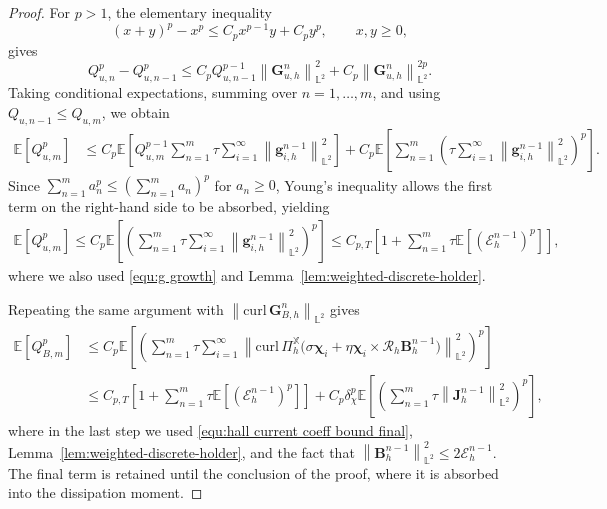 \documentclass[11pt, reqno]{amsart}
\theoremstyle{definition}
\numberwithin{equation}{section}
\newcommand{\curl}{\mathrm{curl}\,}
\newcommand{\bff}{\boldsymbol}
\newcommand{\bb}{\mathbb}
\newcommand{\norm}[2]{\left\|{#1}\right\|_{#2}}
\begin{document}
\begin{proof}
	For $p>1$, the elementary inequality
	\[
	(x+y)^p-x^p
	\le
	C_px^{p-1}y+C_py^p,
	\qquad x,y\ge0,
	\]
	gives
	\[
	Q_{u,n}^p-Q_{u,n-1}^p
	\le
	C_pQ_{u,n-1}^{p-1}
	\norm{\bff G_{u,h}^n}{\bb L^2}^2
	+
	C_p\norm{\bff G_{u,h}^n}{\bb L^2}^{2p}.
	\]
	Taking conditional expectations, summing over $n=1,\ldots,m$, and using
	$Q_{u,n-1}\le Q_{u,m}$, we obtain
	\begin{align*}
		\bb E[Q_{u,m}^p]
		&\le
		C_p\bb E\left[
		Q_{u,m}^{p-1}
		\sum_{n=1}^{m}\tau
		\sum_{i=1}^{\infty}
		\norm{\bff g_{i,h}^{n-1}}{\bb L^2}^2
		\right]
		+
		C_p\bb E\left[
		\sum_{n=1}^{m}
		\left(
		\tau\sum_{i=1}^{\infty}
		\norm{\bff g_{i,h}^{n-1}}{\bb L^2}^2
		\right)^p
		\right].
	\end{align*}
	Since $\sum_{n=1}^{m}a_n^p
	\le
	\left(\sum_{n=1}^{m}a_n\right)^p$ for $a_n\ge0$,
	Young's inequality allows the first term on the right-hand side to be absorbed, yielding
	\begin{align}
		\label{equ:Q u p bound revised}
		\bb E[Q_{u,m}^p]
		\le
		C_p\bb E\left[
		\left(
		\sum_{n=1}^{m}\tau
		\sum_{i=1}^{\infty}
		\norm{\bff g_{i,h}^{n-1}}{\bb L^2}^2
		\right)^p
		\right]
		\le
		C_{p,T}
		\left[
		1+
		\sum_{n=1}^{m}\tau
		\bb E\left[(\mathcal E_h^{n-1})^p\right]
		\right],
	\end{align}
	where we also used \eqref{equ:g growth} and
	Lemma~\ref{lem:weighted-discrete-holder}.

	
	Repeating the same argument with
	$\norm{\curl\bff G_{B,h}^n}{\bb L^2}$ gives
	\begin{align}\label{equ:Q B p bound revised}
		\bb E[Q_{B,m}^p]
		&\le
		C_p\bb E\left[
		\left(
		\sum_{n=1}^{m}\tau
		\sum_{i=1}^{\infty}
		\norm{
			\curl\Pi_h^{\bb X}
			\bigl(
			\sigma\bff\chi_i
			+
			\eta\bff\chi_i\times\mathcal R_h\bff B_h^{n-1}
			\bigr)}
		{\bb L^2}^2
		\right)^p
		\right]
		\nonumber\\
		&\leq
		C_{p,T}
		\left[
		1+
		\sum_{n=1}^{m}\tau
		\bb E\left[(\mathcal E_h^{n-1})^p\right]
		\right]
		+
		C_p\delta_\chi^p
		\bb E\left[
		\left(
		\sum_{n=1}^{m}\tau
		\norm{\bff J_h^{n-1}}{\bb L^2}^2
		\right)^p
		\right],
	\end{align}
	where in the last step we used \eqref{equ:hall current coeff bound final}, Lemma~\ref{lem:weighted-discrete-holder}, and the fact that
	$\norm{\bff B_h^{n-1}}{\bb L^2}^2\le2\mathcal E_h^{n-1}$.
	The final term is retained until the conclusion of the proof, where it is absorbed into the dissipation moment.


\end{proof}
\end{document}

